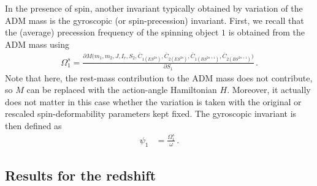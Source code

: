 \documentclass[prd,superscriptaddress,preprintnumbers,tightenlines,nofootinbib, eqsecnum]{revtex4-2}
\begin{document}
In the presence of spin, another invariant typically obtained by variation of the ADM mass is the gyroscopic (or spin-precession) invariant. First, we recall that the (average) precession frequency of the spinning object $1$ is obtained from the ADM mass using~\cite{Bini:2019lkm}  
\begin{align}
    \Omega_1^s = \frac{\partial M\Big(m_1,m_2,J,I_r, S_2,\bar{C}_{1(ES^{2n})},\bar{C}_{2(ES^{2n})},\bar{C}_{1(BS^{2n+1})},\bar{C}_{2(BS^{2n+1})} \Big)}{\partial S_1}  \,.
\end{align}
Note that here, the rest-mass contribution to the ADM mass does not contribute, so $M$ can be replaced with the action-angle Hamiltonian $H$. Moreover,  it actually does not matter in this case whether the variation is taken with the original or rescaled spin-deformability parameters kept fixed. The gyroscopic invariant is then defined as~\cite{Bini:2019lkm}
\begin{align}
    \psi_1&= \frac{\Omega_1^s}{\omega} \,.
\end{align}
%





\subsection{Results for the redshift}
\label{subsec:redshift}
\end{document}
